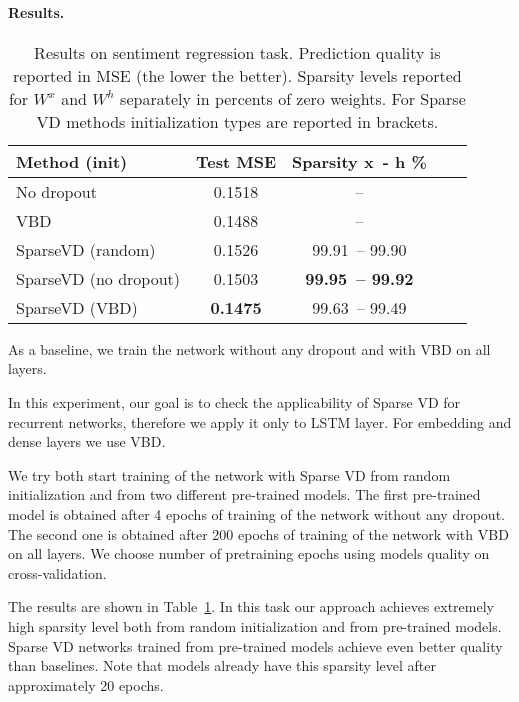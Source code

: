 \documentclass{article}
\begin{document}
\paragraph{Results.}
\begin{table}[t]
\caption{Results on sentiment regression task. Prediction quality is reported in MSE (the lower the better). Sparsity levels reported for $W^x$ and $W^h$ separately in percents of zero weights. For Sparse VD methods initialization types are reported in brackets.}
\label{sentiment}
\vskip -0.15in
\begin{center}
\begin{small}
\begin{tabular}{lcccr}
\hline
\abovespace\belowspace
Method (init) & Test MSE & Sparsity x~- h \% \\
\hline
\abovespace
No dropout & 0.1518 &  --\\
\belowspace
VBD & 0.1488 &  --\\
\hline
\abovespace
SparseVD (random)  & 0.1526&  99.91~-- 99.90\\
SparseVD (no dropout)  & 0.1503&  {\bf 99.95~-- 99.92}\\
\belowspace
SparseVD (VBD)  & {\bf 0.1475}& 99.63~-- 99.49\\
\hline
\end{tabular}
\end{small}
\end{center}
\vskip -0.15in
\end{table}
As a baseline, we train the network without any dropout and with VBD on all layers. 

In this experiment, our goal is to check the applicability of Sparse VD for recurrent networks, therefore we apply it only to LSTM layer. For embedding and dense layers we use VBD. 

We try both start training of the network with Sparse VD from random initialization and from two different pre-trained models. The first pre-trained model is obtained after 4 epochs of training of the network without any dropout. The second one is obtained after 200 epochs of training of the network with VBD on all layers. 
We choose number of pretraining epochs using models quality on cross-validation.

The results are shown in Table~\ref{sentiment}. In this task our approach achieves extremely high sparsity level both from random initialization and from pre-trained models. Sparse VD networks trained from pre-trained models achieve even better quality than baselines. Note that models already have this sparsity level after approximately 20 epochs. 
\end{document}

